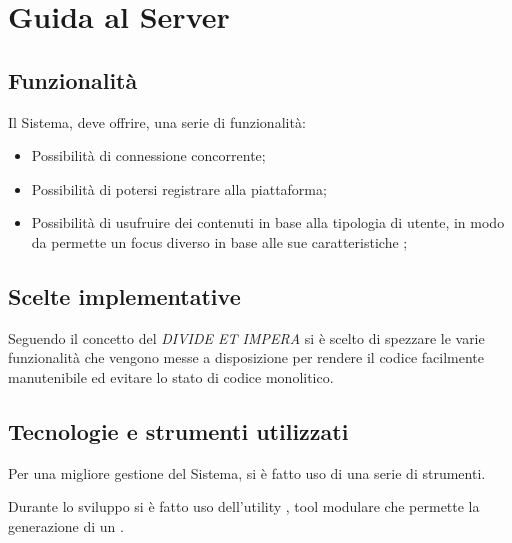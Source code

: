 \documentclass{./document_class}
\begin{document}
      \section{Guida al Server}
        \subsection{Funzionalità}
          Il Sistema, deve offrire, una serie di funzionalità:
          \begin{itemize}
            \item Possibilità di connessione concorrente;
            \item Possibilità di potersi registrare alla piattaforma\footnotemark {};
            \item Possibilità di usufruire dei contenuti in base alla tipologia di utente, in modo da permette un focus diverso in base alle sue caratteristiche\footnotemark {} ;
          \end{itemize}

        \subsection{Scelte implementative}
            Seguendo il concetto del \emph{DIVIDE ET IMPERA}\footnotemark {} si è scelto di spezzare le varie funzionalità che vengono messe a disposizione per rendere il codice facilmente manutenibile ed evitare lo stato di codice monolitico\footnotemark {}.
        \subsection{Tecnologie e strumenti utilizzati}
          Per una migliore gestione del Sistema, si è fatto uso di una serie di strumenti.

          Durante lo sviluppo si è fatto uso dell'utility \footnotemark {} , tool modulare che permette la generazione di un \footnotemark {} .
\end{document}
